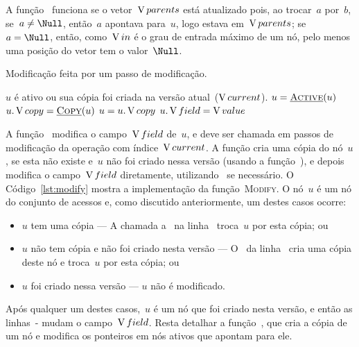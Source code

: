 \documentclass[main.tex]{subfiles}
\begin{document}
A função~ funciona se o vetor~$\operatorname{V}{parents}$ está atualizado pois, ao trocar~$a$ por~$b$, se~$a \neq \Null$, então~$a$ apontava para~$u$, logo estava em~$\operatorname{V}{parents}$; se~$a = \Null$, então, como~$\operatorname{V}{in}$ é o grau de entrada máximo de um nó, pelo menos uma posição do vetor tem o valor~$\Null$.

\begin{algorithm}
\caption{Modificação feita por um passo de modificação.} \label{lst:modify}
\begin{algorithmic}[1]

\Require $u$ é ativo ou sua cópia foi criada na versão atual~($\operatorname{V}{current}$).
	\State $u = \Call{\auxfunc{Active}}{u}$ \label{line:modify:active}
	 \label{line:modify:if2}
		\State $u.\cp = \Call{\auxfunc{Copy}}{u}$ \label{line:modify:copy}
		\State $u = u.\operatorname{V}{copy}$
	\EndIf
	 \label{line:modify:chngb}
		\State {}
	\Else
		\State $u.\operatorname{V}{field} = \operatorname{V}{value}$
		\EndIf \label{line:modify:chnge}
\EndFunction

\end{algorithmic}
\end{algorithm}

A função~ modifica o campo~$\operatorname{V}{field}$ de~$u$, e deve ser chamada em passos de modificação da operação com índice~$\operatorname{V}{current}$. A função cria uma cópia do nó~$u$, se esta não existe e~$u$ não foi criado nessa versão (usando a função~\textsc{}), e depois modifica o campo~$\operatorname{V}{field}$ diretamente, utilizando~\textsc{} se necessário.
O Código~\ref{lst:modify} mostra a implementação da função~\textsc{Modify}. O nó~$u$ é um nó do conjunto de acessos e, como discutido anteriormente, um destes casos ocorre:
\begin{itemize}
	\item $u$ tem uma cópia --- A chamada a~\textsc{} na linha~ troca~$u$ por esta cópia; ou
	\item $u$ não tem cópia e não foi criado nesta versão --- O~ da linha~ cria uma cópia deste nó e troca~$u$ por esta cópia; ou
	\item $u$ foi criado nessa versão --- $u$ não é modificado.
\end{itemize}

Após qualquer um destes casos,~$u$ é um nó que foi criado nesta versão, e então as linhas~- mudam o campo~$\operatorname{V}{field}$.
Resta detalhar a função~\textsc{}, que cria a cópia de um nó e modifica os ponteiros em nós ativos que apontam para ele.
\end{document}
